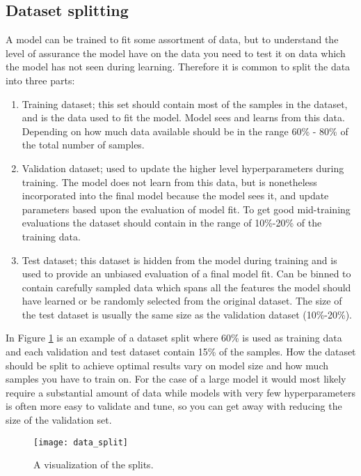 \documentclass[thesis.tex]{subfiles}
\begin{document}
\subsection{Dataset splitting}
A model can be trained to fit some assortment of data, but to understand the level of assurance the model have on the data you need to test it on data which the model has not seen during learning. Therefore it is common to split the data into three parts:
\begin{enumerate}
\item Training dataset; this set should contain most of the samples in the dataset, and is the data used to fit the model. Model sees and learns from this data. Depending on how much data available should be in the range 60\% - 80\% of the total number of samples.

\item Validation dataset; used to update the higher level hyperparameters during training. The model does not learn from this data, but is nonetheless incorporated into the final model because the model sees it, and update parameters based upon the evaluation of model fit. To get good mid-training evaluations the dataset should contain in the range of 10\%-20\% of the training data.

\item Test dataset; this dataset is hidden from the model during training and is used to provide an unbiased evaluation of a final model fit. Can be binned to contain carefully sampled data which spans all the features the model should have learned or be randomly selected from the original dataset. The size of the test dataset is usually the same size as the validation dataset (10\%-20\%).
\end{enumerate}

In Figure \ref{fig:data_split} is an example of a dataset split where 60\% is used as training data and each validation and test dataset contain 15\% of the samples. How the dataset should be split to achieve optimal results vary on model size and how much samples you have to train on. For the case of a large model it would most likely require a substantial amount of data while models with very few hyperparameters is often more easy to validate and tune, so you can get away with reducing the size of the validation set.

\begin{figure} %
  \begin{center}
    \texttt{[image: data\_split]}
    \caption[A visualization of the splits]{A visualization of the splits.}
    \label{fig:data_split}
  \end{center}
\end{figure}
\end{document}
